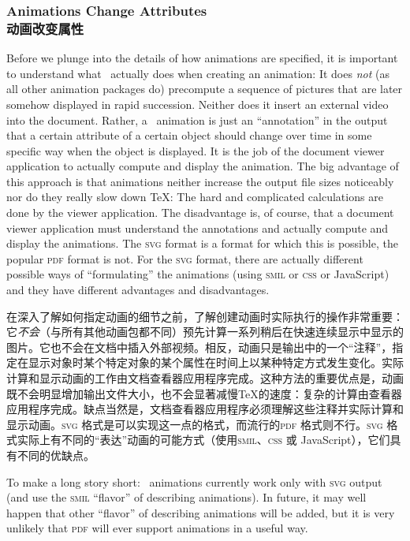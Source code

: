 \subsubsection{Animations Change Attributes\\动画改变属性}

Before we plunge into the details of how animations are specified, it is
important to understand what \tikzname\ actually does when creating an
animation: It does \emph{not} (as all other animation packages do) precompute a
sequence of pictures that are later somehow displayed in rapid succession.
Neither does it insert an external video into the document. Rather, a
\tikzname\ animation is just an ``annotation'' in the output that a certain
attribute of a certain object should change over time in some specific way when
the object is displayed. It is the job of the document viewer application to
actually compute and display the animation. The big advantage of this approach
is that animations neither increase the output file sizes noticeably nor do
they really slow down \TeX: The hard and complicated calculations are done by
the viewer application. The disadvantage is, of course, that a document viewer
application must understand the annotations and actually compute and display
the animations. The \textsc{svg} format is a format for which this is possible,
the popular \textsc{pdf} format is not. For the \textsc{svg} format, there are
actually different possible ways of ``formulating'' the animations (using
\textsc{smil} or \textsc{css} or JavaScript) and they have different advantages
and disadvantages.

在深入了解如何指定动画的细节之前，了解\tikzname 创建动画时实际执行的操作非常重要：它\emph{不会}（与所有其他动画包都不同）预先计算一系列稍后在快速连续显示中显示的图片。它也不会在文档中插入外部视频。相反，\tikzname 动画只是输出中的一个“注释”，指定在显示对象时某个特定对象的某个属性在时间上以某种特定方式发生变化。实际计算和显示动画的工作由文档查看器应用程序完成。这种方法的重要优点是，动画既不会明显增加输出文件大小，也不会显著减慢\TeX 的速度：复杂的计算由查看器应用程序完成。缺点当然是，文档查看器应用程序必须理解这些注释并实际计算和显示动画。\textsc{svg} 格式是可以实现这一点的格式，而流行的\textsc{pdf} 格式则不行。\textsc{svg} 格式实际上有不同的“表达”动画的可能方式（使用\textsc{smil}、\textsc{css} 或 JavaScript），它们具有不同的优缺点。

To make a long story short: \tikzname\ animations currently work only with
\textsc{svg} output (and use the \textsc{smil} ``flavor'' of describing
animations). In future, it may well happen that other ``flavor'' of describing
animations will be added, but it is very unlikely that \textsc{pdf} will ever
support animations in a useful way.

